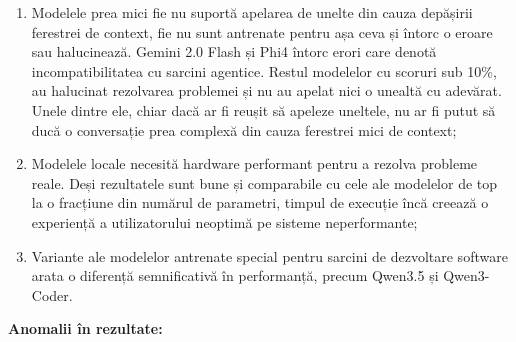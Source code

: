 \documentclass[12pt, a4paper, oneside, romanian]{teza-upb}
\begin{document}
\begin{enumerate}
    \item Modelele prea mici fie nu suportă apelarea de unelte din cauza depășirii ferestrei de context, fie nu sunt antrenate pentru așa ceva și întorc o eroare sau halucinează. Gemini 2.0 Flash și Phi4 întorc erori
    care denotă incompatibilitatea cu sarcini agentice. Restul modelelor cu scoruri sub 10\%, au halucinat rezolvarea problemei și nu au apelat nici o unealtă cu adevărat. Unele dintre ele, chiar dacă ar fi reușit să apeleze uneltele, nu ar fi putut să ducă o conversație prea complexă
    din cauza ferestrei mici de context;
    \item Modelele locale necesită hardware performant pentru a rezolva probleme reale. Deși rezultatele sunt bune și comparabile cu cele ale modelelor de top la o fracțiune din numărul de parametri,
    timpul de execuție încă creează o experiență a utilizatorului neoptimă pe sisteme neperformante;
    \item Variante ale modelelor antrenate special pentru sarcini de dezvoltare software arata o diferență semnificativă în performanță, precum Qwen3.5 și Qwen3-Coder.
  \end{enumerate}

  \textbf{Anomalii în rezultate:}
\end{document}

